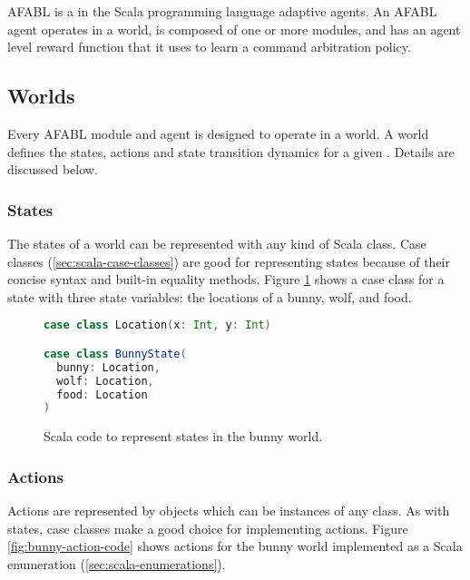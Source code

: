 AFABL is a  in the Scala programming language  adaptive agents. An AFABL agent operates in a world, is composed of one or more modules, and has an agent level reward function that it uses to learn a command arbitration policy.

\subsection{Worlds}

Every AFABL module and agent is designed to operate in a world. A world defines the states, actions and state transition dynamics for a given . Details are discussed below.

\subsubsection{States}

The states of a world can be represented with any kind of Scala class. Case classes (\ref{sec:scala-case-classes}) are good for representing states because of their concise syntax and built-in equality methods. Figure \ref{fig:bunny-state-code} shows a case class for a state with three state variables: the locations of a bunny, wolf, and food.

\begin{figure}[!h]
\begin{center}

\begin{lstlisting}[language=Scala]
case class Location(x: Int, y: Int)

case class BunnyState(
  bunny: Location,
  wolf: Location,
  food: Location
)
\end{lstlisting}

\caption{Scala code to represent states in the bunny world.}
\end{center}
\label{fig:bunny-state-code}
\end{figure}

\subsubsection{Actions}

Actions are represented by objects which can be instances of any class. As with states, case classes make a good choice for implementing actions. Figure \ref{fig:bunny-action-code} shows actions for the bunny world implemented as a Scala enumeration (\ref{sec:scala-enumerations}).

